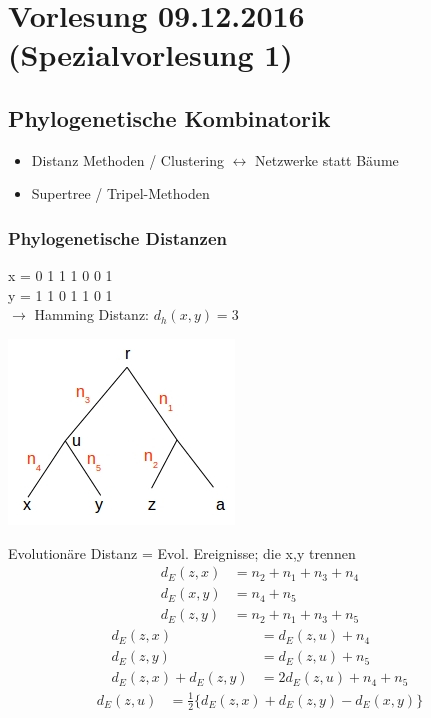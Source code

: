 \section{Vorlesung 09.12.2016 (Spezialvorlesung 1)}
\subsection{Phylogenetische Kombinatorik}
		
\begin{itemize}
	\item Distanz Methoden / Clustering $\leftrightarrow$ Netzwerke statt Bäume 
	\item Supertree / Tripel-Methoden
\end{itemize}
\subsubsection{Phylogenetische Distanzen}

x = \color{red}0 \color{green}1 \color{red}1 \color{green}1 \color{red}0 \color{green}0 1\\\color{black}
y = \color{red}1 \color{green}1 \color{red}0 \color{green}1 \color{red}1 \color{green}0 1\\
\color{black}$\rightarrow$ Hamming Distanz: $d_h(x,y) = 3$

\begin{center}
	\includegraphics[scale=0.9]{lectures/161209/pix/pic1.jpg}
\end{center}

Evolutionäre Distanz = Evol. Ereignisse; die x,y trennen	
\begin{align*}
	d_E (z,x) &= n_2 + n_1 + n_3 + n_4\\
	d_E (x,y) &= n_4 + n_5\\
	d_E (z,y) &= n_2 + n_1 + n_3 + n_5
\end{align*}
\begin{align*}
	d_E (z,x) &= d_E (z,u) + n_4\\
	d_E (z,y) &= d_E (z,u) + n_5\\
	d_E (z,x) + d_E (z,y) &= 2 d_E(z,u) + n_4 + n_5
\end{align*}
\begin{align*}
	d_E (z,u) &= \frac{1}{2} \lbrace d_E (z,x) + d_E (z,y) - d_E (x,y) \rbrace
\end{align*}

